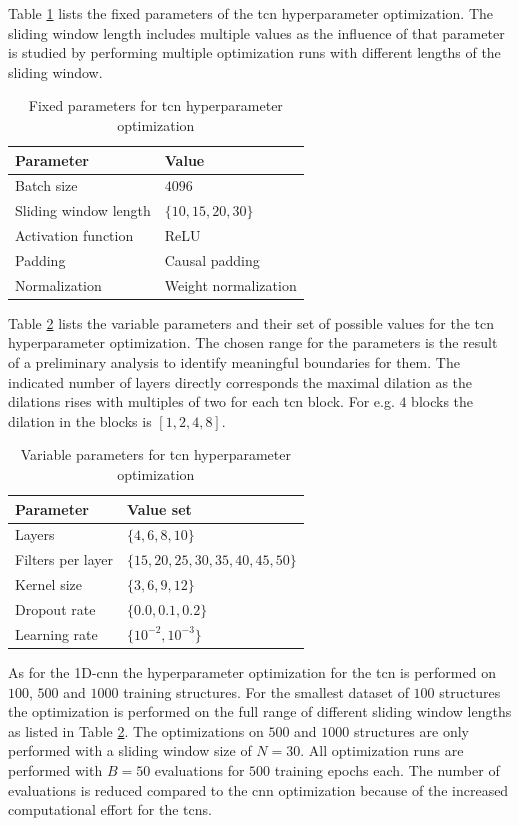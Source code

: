 \documentclass[conference]{IEEEtran}
\begin{document}
Table \ref{tab:fixed_parameters_tcn_optimization} lists the fixed parameters of the \gls{tcn} hyperparameter optimization. The sliding window length includes multiple values as the influence of that parameter is studied by performing multiple optimization runs with different lengths of the sliding window.

\begin{table}[htp]
	\centering
	\caption{Fixed parameters for \gls{tcn} hyperparameter optimization}
	\label{tab:fixed_parameters_tcn_optimization}
	\begin{tabular}{ll}
		\textbf{Parameter} & \textbf{Value} \\
		\hline
		Batch size & $ 4096 $ \\
		Sliding window length & $ \{10, 15, 20, 30\} $ \\
		Activation function & ReLU \\
		Padding & Causal padding \\
		Normalization & Weight normalization
	\end{tabular}
\end{table}

Table \ref{tab:variable_parameters_tcn_optimization} lists the variable parameters and their set of possible values for the \gls{tcn} hyperparameter optimization. The chosen range for the parameters is the result of a preliminary analysis to identify meaningful boundaries for them. The indicated number of layers directly corresponds the maximal dilation as the dilations rises with multiples of two for each \gls{tcn} block. For e.g. $ 4 $ blocks the dilation in the blocks is $ [1, 2, 4, 8] $.

\begin{table}[htp]
	\centering
	\caption{Variable parameters for \gls{tcn} hyperparameter optimization}
	\label{tab:variable_parameters_tcn_optimization}
	\begin{tabular}{ll}
		\textbf{Parameter} & \textbf{Value set} \\
		\hline
		Layers & $ \{4, 6, 8, 10\} $ \\
		Filters per layer & $ \{15, 20, 25, 30, 35, 40, 45, 50\} $ \\
		Kernel size & $ \{3, 6, 9, 12\} $ \\
		Dropout rate & $ \{0.0, 0.1, 0.2\} $ \\
		Learning rate & $ \{10^{-2}, 10^{-3}\} $
	\end{tabular}
\end{table}

As for the 1D-\gls{cnn} the hyperparameter optimization for the \gls{tcn} is performed on $ 100 $, $ 500 $ and $ 1000 $  training structures. For the smallest dataset of $ 100 $ structures the optimization is performed on the full range of different sliding window lengths as listed in Table \ref{tab:variable_parameters_tcn_optimization}. The optimizations on $ 500 $ and $ 1000 $ structures are only performed with a sliding window size of $ N = 30 $. All optimization runs are performed with $ B = 50 $ evaluations for $ 500 $ training epochs each. The number of evaluations is reduced compared to the \gls{cnn} optimization because of the increased computational effort for the \glspl{tcn}.
\end{document}
